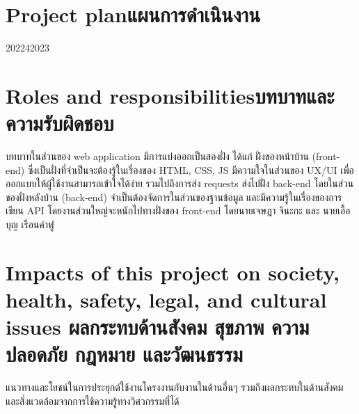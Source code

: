 \section{\ifenglish Project plan\else แผนการดำเนินงาน\fi}

\begin{plan}{1}{2022}{4}{2023}
\end{plan}

\section{\ifenglish Roles and responsibilities\else บทบาทและความรับผิดชอบ\fi}
บทบาทในส่วนของ web application มีการแบ่งออกเป็นสองฝั่ง ได้แก่ 
%
ฝั่งของหน้าบ้าน (front-end) ซึ่งเป็นฝั่งที่จำเป็นจะต้องรู้ในเรื่องของ HTML, CSS, JS มีความใจในส่วนของ UX/UI เพื่อออกแบบให้ผู้ใช้งานสามารถเข้าใจได้ง่าย 
%
รวมไปถึงการส่ง requests ส่งไปฝั่ง back-end โดยในส่วนของฝั่งหลังบ้าน (back-end) จำเป็นต้องจัดการในส่วนของฐานข้อมูล และมีความรู้ในเรื่องของการเขียน API 
%
โดยงานส่วนใหญ่จะหนักไปทางฝั่งของ front-end โดยนายเจษฎา จินะกะ และ นายเอื้อบุญ เรือนคำฟู 

\section{\ifenglish%
Impacts of this project on society, health, safety, legal, and cultural issues
\else%
ผลกระทบด้านสังคม สุขภาพ ความปลอดภัย กฎหมาย และวัฒนธรรม
\fi}

แนวทางและโยชน์ในการประยุกต์ใช้งานโครงงานกับงานในด้านอื่นๆ รวมถึงผลกระทบในด้านสังคมและสิ่งแวดล้อมจากการใช้ความรู้ทางวิศวกรรมที่ได้
